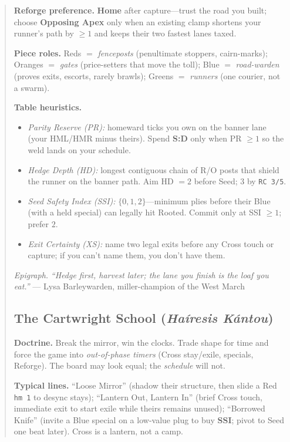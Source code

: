 \documentclass[11pt]{article}
\begin{document}
\begin{quote}
\medskip
\noindent\textbf{Reforge preference.} \textbf{Home} after capture—trust the road you built; choose \textbf{Opposing Apex} only when an existing clamp shortens your runner’s path by $\ge 1$ and keeps their two fastest lanes taxed.

\medskip
\noindent\textbf{Piece roles.} Reds $=$ \emph{fenceposts} (penultimate stoppers, cairn-marks); Oranges $=$ \emph{gates} (price-setters that move the toll); Blue $=$ \emph{road-warden} (proves exits, escorts, rarely brawls); Greens $=$ \emph{runners} (one courier, not a swarm).

\medskip
\noindent\textbf{Table heuristics.}
\begin{itemize}[leftmargin=1.3em,itemsep=0.2em]
  \item \emph{Parity Reserve (PR):} homeward ticks you own on the banner lane (your HML/HMR minus theirs). Spend \textbf{S:D} only when PR $\ge 1$ so the weld lands on your schedule.
  \item \emph{Hedge Depth (HD):} longest contiguous chain of R/O posts that shield the runner on the banner path. Aim HD $=2$ before Seed; $3$ by \texttt{RC 3/5}.
  \item \emph{Seed Safety Index (SSI):} $\{0,1,2\}$—minimum plies before their Blue (with a held special) can legally hit Rooted. Commit only at SSI $\ge 1$; prefer $2$.
  \item \emph{Exit Certainty (XS):} name two legal exits before any Cross touch or capture; if you can’t name them, you don’t have them.
\end{itemize}

\medskip
\noindent\textit{Epigraph.} \emph{“Hedge first, harvest later; the lane you finish is the loaf you eat.”} — Lysa Barleywarden, miller-champion of the West March
\clearpage
\subsection{The Cartwright School (\textit{Haíresis Kántou})}
\noindent\textbf{Doctrine.} Break the mirror, win the clocks. Trade shape for time and force the game into \emph{out-of-phase timers} (Cross stay/exile, specials, Reforge). The board may look equal; the \emph{schedule} will not.

\medskip
\noindent\textbf{Typical lines.} ``Loose Mirror'' (shadow their structure, then slide a Red \texttt{hm 1} to desync stays); ``Lantern Out, Lantern In'' (brief Cross touch, immediate exit to start exile while theirs remains unused); ``Borrowed Knife'' (invite a Blue special on a low-value plug to buy \textbf{SSI}; pivot to Seed one beat later). Cross is a lantern, not a camp.


\end{quote}
\end{document}
